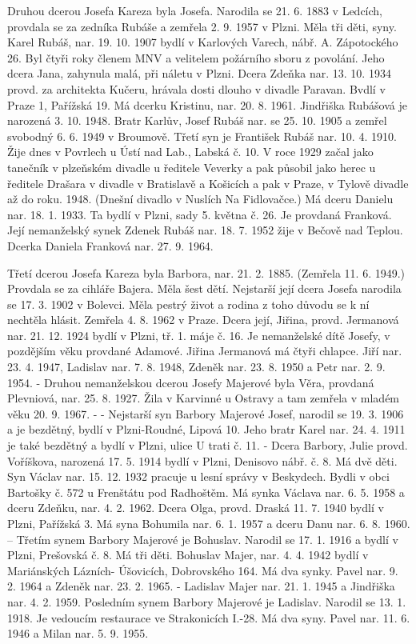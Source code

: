 \documentclass[../dejiny-rodu-prusiku.tex]{subfiles}
\begin{document}
Druhou dcerou Josefa Kareza byla Josefa. Narodila se 21. 6. 1883 v Ledcích, provdala se za zedníka Rubáše a zemřela 2. 9. 1957 v Plzni. Měla tři děti, syny. Karel Rubáš, nar. 19. 10. 1907 bydlí v Karlových Varech, nábř. A. Zápo­tockého 26. Byl čtyři roky členem MNV a velitelem požár­ního sboru z povolání. Jeho dcera Jana, zahynula malá, při náletu v Plzni. Dcera Zdeňka nar. 13. 10. 1934 provd. za architekta Kučeru, hrávala dosti dlouho v divadle Paravan. Bvdlí v Praze 1, Pařížská 19. Má dcerku Kristinu, nar. 20. 8. 1961. Jindřiška Rubášová je narozená 3. 10. 1948. Bratr Karlův, Josef Rubáš nar. se 25. 10. 1905 a zemřel svobodný 6. 6. 1949 v Broumově. Třetí syn je František Rubáš
nar. 10. 4. 1910. Žije dnes v Povrlech u Ústí nad Lab., Labská č. 10. V roce 1929 začal jako tanečník v plzeňském divadle u ředitele Veverky a pak působil jako herec u ředitele Drašara v divadle v Bratisla­vě a Košicích a pak v Praze, v Tylově divadle až do roku. 1948. (Dnešní divadlo v Nuslích Na Fidlovačce.) Má dceru Danielu nar. 18. 1. 1933. Ta bydlí v Plzni, sady 5. května  č. 26. Je provdaná Franková. Její neman­želský synek Zdenek Rubáš nar. 18. 7. 1952 žije v Bečově nad Teplou. Dcerka Daniela Franková nar. 27. 9. 1964.

Třetí dcerou Josefa Kareza byla Barbora, nar. 21. 2. 1885. (Zemřela 11. 6. 1949.) Provdala se za cihláře Bajera. Měla šest dětí. Nejstarší její dcera Josefa narodila se 17. 3. 1902 v Bolevci. Měla pestrý život a rodina z toho důvodu se k ní nechtěla hlásit. Zemřela 4. 8. 1962 v Praze. Dcera její, Jiřina, provd. Jermanová nar. 21. 12. 1924 bydlí v Plzni, tř. 1. máje č. 16. Je nemanželské dítě Josefy, v pozdějším věku provdané Adamové. Jiřina Jermanová má čtyři chlapce. Jiří nar. 23. 4. 1947, Ladislav nar. 7. 8. 1948, Zdeněk nar. 23. 8. 1950 a Petr nar. 2. 9. 1954. - Druhou nemanželskou dcerou Josefy Majerové byla Věra, provdaná Plevniová, nar. 25. 8. 1927. Žila v Karvinné u Ostravy a tam zemřela v mladém věku 20. 9. 1967.  - - Nejstarší syn Barbory Majerové Josef, narodil se 19. 3. 1906 a je bezdětný, bydlí v Plzni-Roudné, Lipová 10. Jeho bratr Karel nar. 24. 4. 1911 je také bez­dětný a bydlí v Plzni, ulice U trati č. 11. - Dcera Barbory, Julie provd. Voříškova, narozená 17. 5. 1914 bydlí v Plzni, Denisovo nábř. č. 8. Má dvě děti. Syn Václav nar. 15. 12. 1932 pracuje u lesní správy v Beskydech. Bydli v obci Bartošky č. 572 u Frenštátu pod Radhoštěm. Má syn­ka Václava nar. 6. 5. 1958 a dceru Zdeňku, nar. 4. 2. 1962. Dcera Olga, provd. Draská 11. 7. 1940 bydlí v Plzni, Paříž­ská 3. Má syna Bohumila nar. 6. 1. 1957 a dceru Danu nar. 6. 8. 1960. -- Třetím synem Barbory Majerové je Bohuslav. Narodil se 17. 1. 1916 a bydlí v Plzni, Prešovská č. 8. Má tři děti. Bohuslav Majer, nar. 4. 4. 1942 bydlí v Marián­ských Lázních- Úšovicích, Dobrovského 164. Má dva synky. Pavel nar. 9. 2. 1964 a Zdeněk nar. 23. 2. 1965. - Ladislav Majer nar. 21. 1. 1945 a Jindřiška nar. 4. 2. 1959. Posledním sy­nem Barbory Majerové je Ladislav. Narodil se 13. 1. 1918. Je vedoucím restaurace ve Strakonicích I.-28. Má dva syny. Pavel nar. 11. 6. 1946 a Milan nar. 5. 9. 1955.
\end{document}
